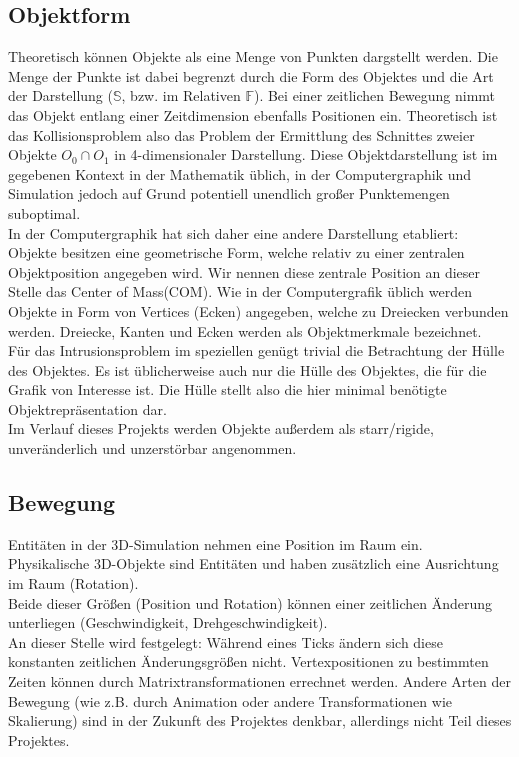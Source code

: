 \subsection{Objektform}
\label{sec:l0_objects}
Theoretisch können Objekte als eine Menge von Punkten dargstellt werden. Die Menge der Punkte ist dabei begrenzt durch die Form des Objektes und die Art der Darstellung ($\mathbb{S}$, bzw. im Relativen $\mathbb{F}$).
Bei einer zeitlichen Bewegung nimmt das Objekt entlang einer Zeitdimension ebenfalls Positionen ein. Theoretisch ist das Kollisionsproblem also das Problem der Ermittlung des Schnittes zweier Objekte $O_0 \cap O_1$ in 4-dimensionaler Darstellung. Diese Objektdarstellung ist im gegebenen Kontext in der Mathematik üblich, in der Computergraphik und Simulation jedoch auf Grund potentiell unendlich großer Punktemengen suboptimal.\\
In der Computergraphik hat sich daher eine andere Darstellung etabliert:\\
Objekte besitzen eine geometrische Form, welche relativ zu einer zentralen Objektposition angegeben wird. Wir nennen diese zentrale Position an dieser Stelle das \glqq Center of Mass(COM)\grqq . 
Wie in der Computergrafik üblich werden Objekte in Form von Vertices (Ecken) angegeben, welche zu Dreiecken verbunden werden. Dreiecke, Kanten und Ecken werden als Objektmerkmale bezeichnet.\\
Für das Intrusionsproblem im speziellen genügt trivial die Betrachtung der Hülle des Objektes. Es ist üblicherweise auch nur die Hülle des Objektes, die für die Grafik von Interesse ist. Die Hülle stellt also die hier minimal benötigte Objektrepräsentation dar.\\

Im Verlauf dieses Projekts werden Objekte außerdem als starr/rigide, unveränderlich und unzerstörbar angenommen.
	
\subsection{Bewegung}
Entitäten in der 3D-Simulation nehmen eine Position im Raum ein.\\
Physikalische 3D-Objekte sind Entitäten und haben zusätzlich eine Ausrichtung im Raum (Rotation).\\
Beide dieser Größen (Position und Rotation) können einer zeitlichen Änderung unterliegen (Geschwindigkeit, Drehgeschwindigkeit).\\
An dieser Stelle wird festgelegt: Während eines Ticks ändern sich diese konstanten zeitlichen Änderungsgrößen nicht. Vertexpositionen zu bestimmten Zeiten können durch Matrixtransformationen errechnet werden.
Andere Arten der Bewegung (wie z.B. durch Animation oder andere Transformationen wie Skalierung) sind in der Zukunft des Projektes denkbar, allerdings nicht Teil dieses Projektes.



